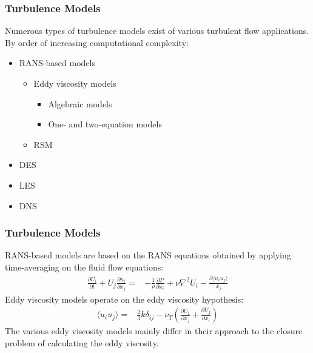 \begin{frame}
  \frametitle{Turbulence Models}
  Numerous types of turbulence models exist of various turbulent flow applications. By order of
  increasing computational complexity:
  \begin{itemize}
      \item RANS-based models
      \begin{itemize}
          \item Eddy viscosity models
          \begin{itemize}
              \item Algebraic models
              \item One- and two-equation models
          \end{itemize}
          \item \gls{RSM}
      \end{itemize}
      \item \gls{DES}
      \item \gls{LES}
      \item \gls{DNS}
  \end{itemize}
\end{frame}

\begin{frame}
  \frametitle{Turbulence Models}
  \gls{RANS}-based models are based on the RANS equations obtained by applying time-averaging on
  the fluid flow equations:
  \begin{align}
      \frac{\partial U_i}{\partial t} + U_j \frac{\partial u_i}{\partial x_j} =&
      -\frac{1}{\rho} \frac{\partial P}{\partial x_i} + \nu \nabla^2 U_i -
      \frac{\partial \langle u_i u_j \rangle}{x_j}
  \end{align}
  Eddy viscosity models operate on the eddy viscosity hypothesis:
  \begin{align}
      \langle u_iu_j \rangle =& \frac{2}{3}k \delta_{ij} - \nu_T \left(
      \frac{\partial U_i}{\partial x_j} + \frac{\partial U_j}{\partial x_i}
      \right)
  \end{align}
  The various eddy viscosity models mainly differ in their approach to the closure problem of
  calculating the eddy viscosity.
\end{frame}

